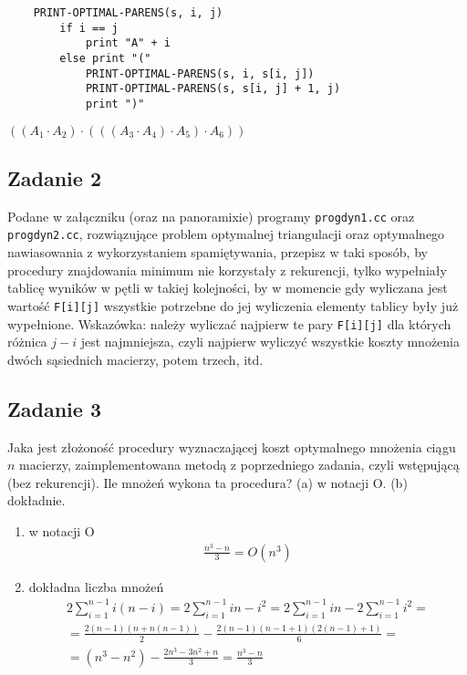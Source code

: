 \documentclass{article}
\begin{document}
\begin{center}
    \begin{lstlisting}
    PRINT-OPTIMAL-PARENS(s, i, j)
        if i == j
            print "A" + i
        else print "("
            PRINT-OPTIMAL-PARENS(s, i, s[i, j])
            PRINT-OPTIMAL-PARENS(s, s[i, j] + 1, j)
            print ")"
    \end{lstlisting}
    $((A_1 \cdot A_2) \cdot (((A_3 \cdot A_4) \cdot A_5) \cdot A_6))$
\end{center}

\subsection*{Zadanie 2}
Podane w załączniku (oraz na panoramixie) programy \verb|progdyn1.cc| oraz \verb|progdyn2.cc|,
rozwiązujące problem optymalnej triangulacji oraz optymalnego nawiasowania z wykorzystaniem
spamiętywania, przepisz w taki sposób, by procedury znajdowania minimum
nie korzystały z rekurencji, tylko wypełniały tablicę wyników w pętli w takiej kolejności,
by w momencie gdy wyliczana jest wartość \verb|F[i][j]| wszystkie potrzebne do jej wyliczenia
elementy tablicy były już wypełnione. Wskazówka: należy wyliczać najpierw te pary
\verb|F[i][j]| dla których różnica $j-i$ jest najmniejsza, czyli najpierw wyliczyć wszystkie
koszty mnożenia dwóch sąsiednich macierzy, potem trzech, itd.

\subsection*{Zadanie 3}
Jaka jest złożoność procedury wyznaczającej koszt optymalnego mnożenia ciągu
$n$ macierzy, zaimplementowana metodą z poprzedniego zadania, czyli wstępującą (bez rekurencji).
Ile mnożeń wykona ta procedura? (a) w notacji O. (b) dokładnie.
\begin{enumerate}[label=(\alph*)]
    \item w notacji O
          \begin{gather*}
              \frac{n^3-n}{3} = O(n^3)
          \end{gather*}
    \item dokładna liczba mnożeń
          \begin{gather*}
              2\sum_{i=1}^{n-1} i(n-i) = 2\sum_{i=1}^{n-1} in - i^2 = 2\sum_{i=1}^{n-1} in - 2\sum_{i=1}^{n-1} i^2 = \\
              = \frac{2(n-1)(n+n(n-1))}{2} - \frac{2(n-1)(n-1+1)(2(n-1)+1)}{6} = \\
              = (n^3-n^2) - \frac{2n^3-3n^2+n}{3} = \frac{n^3-n}{3}
          \end{gather*}
\end{enumerate}
\end{document}
